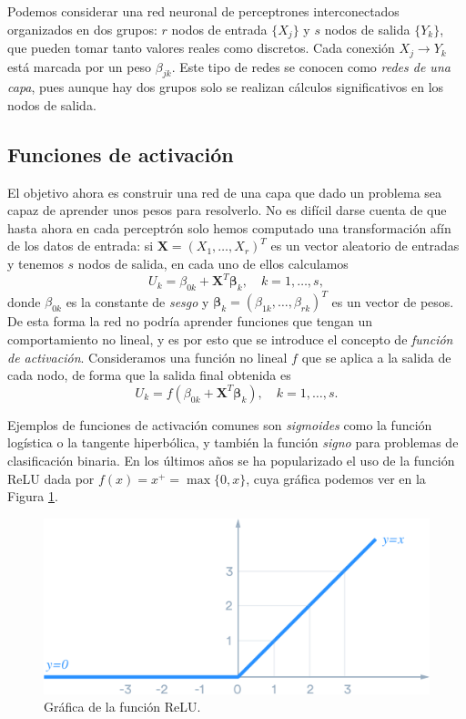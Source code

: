 \documentclass[
  a4paper,
  12pt,
  spanish,
]{scrartcl}
\theoremstyle{teorema-style}
\begin{document}
Podemos considerar una red neuronal de perceptrones interconectados organizados en dos grupos: $r$ nodos de entrada $\{X_j\}$ y $s$ nodos de salida $\{Y_k\}$, que pueden tomar tanto valores reales como discretos. Cada conexión $X_j \to Y_k$ está marcada por un peso $\beta_{jk}$. Este tipo de redes se conocen como \textit{redes de una capa}, pues aunque hay dos grupos solo se realizan cálculos significativos en los nodos de salida.

\subsection{Funciones de activación}

El objetivo ahora es construir una red de una capa que dado un problema sea capaz de aprender unos pesos para resolverlo. No es difícil darse cuenta de que hasta ahora en cada perceptrón solo hemos computado una transformación afín de los datos de entrada: si $\mathbf{X}=(X_1, \dots, X_r)^T$ es un vector aleatorio de entradas y tenemos $s$ nodos de salida, en cada uno de ellos calculamos
\[
U_k = \beta_{0k} + \mathbf{X}^T \pmb\beta_k, \quad k = 1,\dots, s,
\]
donde $\beta_{0k}$ es la constante de \textit{sesgo} y $\pmb{\beta}_k = (\beta_{1k}, \dots, \beta_{rk})^T$ es un vector de pesos. De esta forma la red no podría aprender funciones que tengan un comportamiento no lineal, y es por esto que se introduce el concepto de \textit{función de activación}. Consideramos una función no lineal $f$ que se aplica a la salida de cada nodo, de forma que la salida final obtenida es
\[
U_k = f(\beta_{0k} + \mathbf{X}^T \pmb{\beta}_k), \quad k = 1,\dots, s.
\]

Ejemplos de funciones de activación comunes son \textit{sigmoides} como la función logística o la tangente hiperbólica, y también la función \textit{signo} para problemas de clasificación binaria. En los últimos años se ha popularizado el uso de la función ReLU dada por $f(x) = x^+ = \max{\{0, x\}}$, cuya gráfica podemos ver en la Figura \ref{fig:relu}.

\begin{figure}[h]
  \centering
  \includegraphics[width=.7\textwidth]{img/relu}
  \caption{Gráfica de la función ReLU.}
  \label{fig:relu}
\end{figure}
\end{document}
